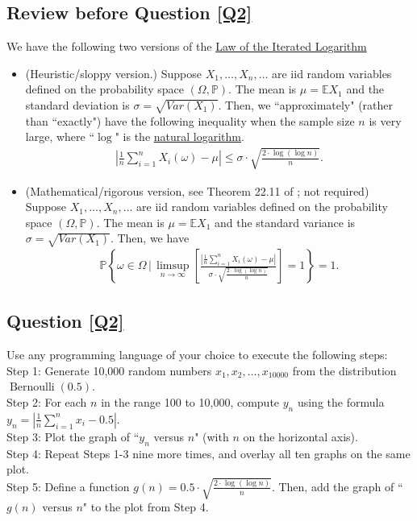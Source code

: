 \documentclass[11pt,letterpaper, leqno]{article}
\numberwithin{equation}{section}
\numberwithin{theorem}{section}
\numberwithin{lemma}{section}
\numberwithin{corollary}{section}
\numberwithin{definition}{section}
\numberwithin{proposition}{section}
\numberwithin{remark}{section}
\numberwithin{example}{section}
\begin{document}
\subsection{Review before Question \ref{Q2}}

We have the following two versions of the \href{https://en.wikipedia.org/wiki/Law_of_the_iterated_logarithm}{Law of the Iterated Logarithm}
\begin{itemize}
    \item (Heuristic/sloppy version.) Suppose $X_1,\ldots,X_n,\ldots$ are iid random variables defined on the probability space $(\Omega, \mathbb{P})$. The mean is $\mu=\mathbb{E}X_1$ and the standard deviation is $\sigma=\sqrt{Var(X_1)}$. Then, we ``approximately" (rather than ``exactly") have the following inequality when the sample size $n$ is very large, where ``$\log$" is the \href{https://en.wikipedia.org/wiki/Natural_logarithm}{natural logarithm}.
    \begin{align*}
        \left\vert\frac{1}{n}\sum_{i=1}^n X_i(\omega)-\mu\right\vert \le \sigma\cdot\sqrt{\frac{2\cdot\log\left(\log n\right)}{n}}.
    \end{align*}
    \item (Mathematical/rigorous version, see Theorem 22.11 of \cite{klenke2013probability}; not required) Suppose $X_1,\ldots,X_n,\ldots$ are iid random variables defined on the probability space $(\Omega, \mathbb{P})$. The mean is $\mu=\mathbb{E}X_1$ and the standard variance is $\sigma=\sqrt{Var(X_1)}$. Then, we have
    \begin{align*}
    \mathbb{P}\left\{\omega\in\Omega \,\Bigg\vert \, \limsup_{n\rightarrow\infty}\left[\frac{\left\vert\frac{1}{n}\sum_{i=1}^n X_i(\omega)-\mu\right\vert}{\sigma\cdot\sqrt{\frac{2\cdot\log\left(\log n\right)}{n}}}\right]=1\right\}=1.
\end{align*}
\end{itemize}

\subsection{Question \ref{Q2}}

Use any programming language of your choice to execute the following steps:\\
Step 1: Generate 10,000 random numbers \(x_1, x_2, \ldots , x_{10000}\) from the distribution \(\operatorname{Bernoulli}(0.5)\). \\
Step 2: For each \(n\) in the range 100 to 10,000, compute \(y_n\) using the formula $y_n = \left| \frac{1}{n} \sum_{i=1}^n x_i - 0.5 \right|$. \\
Step 3: Plot the graph of ``\(y_n\) versus \(n\)" (with \(n\) on the horizontal axis). \\
Step 4: Repeat Steps 1-3 nine more times, and overlay all ten graphs on the same plot. \\
Step 5: Define a function $g(n) = 0.5 \cdot \sqrt{\frac{2 \cdot \log(\log n)}{n}}$. Then, add the graph of ``\(g(n)\) versus \(n\)" to the plot from Step 4. 
\end{document}
